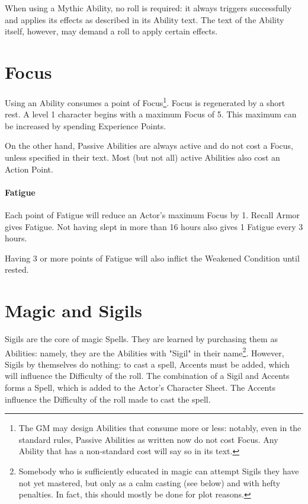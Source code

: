 When using a Mythic Ability, no roll is required: it always triggers successfully and applies its effects as described in its Ability text. The text of the Ability itself, however, may demand a roll to apply certain effects.


\section{Focus}
\label{resources}

Using an Ability consumes a point of Focus\footnote{The GM may design Abilities that consume more or less: notably, even in the standard rules, Passive Abilities as written now do not cost Focus. Any Ability that has a non-standard cost will say so in its text.}. Focus is regenerated by a short rest. A level 1 character begins with a maximum Focus of 5. This maximum can be increased by spending Experience Points. 

On the other hand, Passive Abilities are always active and do not cost a Focus, unless specified in their text. Most (but not all) active Abilities also cost an Action Point.

\paragraph{Fatigue}

Each point of Fatigue will reduce an Actor's maximum Focus by 1. Recall Armor gives Fatigue. Not having slept in more than 16 hours also gives 1 Fatigue every 3 hours.

Having 3 or more points of Fatigue will also inflict the Weakened Condition until rested.


\section{Magic and Sigils}
\label{spells}


Sigils are the core of magic Spells. They are learned by purchasing them as Abilities: namely, they are the Abilities with "Sigil" in their name\footnote{Somebody who is sufficiently educated in magic can attempt Sigils they have not yet mastered, but only as a calm casting (see below) and with hefty penalties. In fact, this should mostly be done for plot reasons.}. However, Sigils by themselves do nothing: to cast a spell, Accents must be added, which will influence the Difficulty of the roll. The combination of a Sigil and Accents forms a Spell, which is added to the Actor's Character Sheet. The Accents influence the Difficulty of the roll made to cast the spell.

